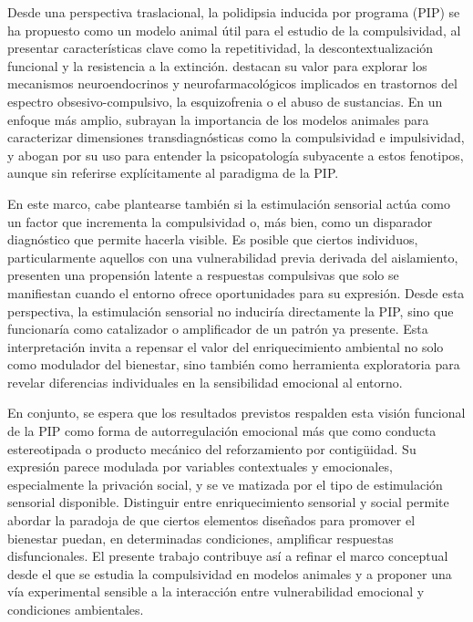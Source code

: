\documentclass[12pt,a4paper]{article}
\begin{document}
\begin{multicols}{2}
Desde una perspectiva traslacional, la polidipsia inducida por programa (PIP) se ha propuesto como un modelo animal útil para el estudio de la compulsividad, al presentar características clave como la repetitividad, la descontextualización funcional y la resistencia a la extinción. \citet{Moreno2012} destacan su valor para explorar los mecanismos neuroendocrinos y neurofarmacológicos implicados en trastornos del espectro obsesivo-compulsivo, la esquizofrenia o el abuso de sustancias. En un enfoque más amplio, \citet{Fineberg2010} subrayan la importancia de los modelos animales para caracterizar dimensiones transdiagnósticas como la compulsividad e impulsividad, y abogan por su uso para entender la psicopatología subyacente a estos fenotipos, aunque sin referirse explícitamente al paradigma de la PIP.

En este marco, cabe plantearse también si la estimulación sensorial actúa como un factor que incrementa la compulsividad o, más bien, como un disparador diagnóstico que permite hacerla visible. Es posible que ciertos individuos, particularmente aquellos con una vulnerabilidad previa derivada del aislamiento, presenten una propensión latente a respuestas compulsivas que solo se manifiestan cuando el entorno ofrece oportunidades para su expresión. Desde esta perspectiva, la estimulación sensorial no induciría directamente la PIP, sino que funcionaría como catalizador o amplificador de un patrón ya presente. Esta interpretación invita a repensar el valor del enriquecimiento ambiental no solo como modulador del bienestar, sino también como herramienta exploratoria para revelar diferencias individuales en la sensibilidad emocional al entorno.

En conjunto, se espera que los resultados previstos respalden esta visión funcional de la PIP como forma de autorregulación emocional más que como conducta estereotipada o producto mecánico del reforzamiento por contigüidad. Su expresión parece modulada por variables contextuales y emocionales, especialmente la privación social, y se ve matizada por el tipo de estimulación sensorial disponible. Distinguir entre enriquecimiento sensorial y social permite abordar la paradoja de que ciertos elementos diseñados para promover el bienestar puedan, en determinadas condiciones, amplificar respuestas disfuncionales. El presente trabajo contribuye así a refinar el marco conceptual desde el que se estudia la compulsividad en modelos animales y a proponer una vía experimental sensible a la interacción entre vulnerabilidad emocional y condiciones ambientales.





\end{multicols}
\end{document}

